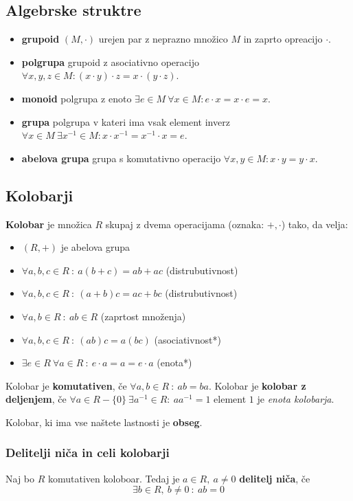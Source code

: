 

	\subsection*{Algebrske struktre}
	\begin{itemize}
		\item \textbf{grupoid} $(M, \cdot)$ urejen par z neprazno množico $M$ in zaprto opreacijo $\cdot$.
		\item \textbf{polgrupa} grupoid z asociativno operacijo $ \forall x,y,z \in M : (x\cdot y)\cdot z = x\cdot (y\cdot z)$.
		\item \textbf{monoid} polgrupa z enoto $ \exists e \in M \ \forall x \in M : e\cdot x = x\cdot e = x$.
		\item \textbf{grupa} polgrupa v kateri ima vsak element inverz $ \forall x \in M \ \exists x^{-1} \in M : x\cdot x^{-1} = x^{-1}\cdot x = e$.
		\item \textbf{abelova grupa} grupa s komutativno operacijo $ \forall x,y \in M  : x\cdot y = y\cdot x$.
	\end{itemize} 

	\subsection*{Kolobarji}
	\textbf{Kolobar} je množica $R$ skupaj z dvema operacijama (oznaka: $+, \cdot$) tako, da velja:
	\begin{itemize}
		\item $(R, +)$ je abelova grupa
		\item $\forall a, b, c \in R\ :\ a(b+c) = ab + ac$ (distrubutivnost)
		\item $\forall a, b, c \in R\ :\ (a+b)c = ac + bc$ (distrubutivnost)
		\item $\forall a, b \in R\ :\ ab \in R$ (zaprtost množenja)
		\item $\forall a, b, c \in R\ :\ (ab)c = a(bc)$ (asociativnost*)
		\item $\exists e \in R\ \forall a \in R\ :\ e\cdot a = a = e\cdot a$ (enota*)
	\end{itemize}
	Kolobar je \textbf{komutativen}, če $\forall a, b \in R\ :\ ab = ba$.
	Kolobar je \textbf{kolobar z deljenjem}, če $\forall a \in R-\{0\}\ \exists a^{-1} \in R :\ aa^{-1} = 1$ element $1$ je \emph{enota kolobarja}.

	Kolobar, ki ima vse naštete lastnosti je \textbf{obseg}.

	\subsubsection*{Delitelji niča in celi kolobarji}
	Naj bo $R$ komutativen koloboar. Tedaj je $a \in R,\ a \neq 0$ \textbf{delitelj niča}, če
	\[ \exists b \in R,\ b \neq 0\ :\ ab = 0 \]

